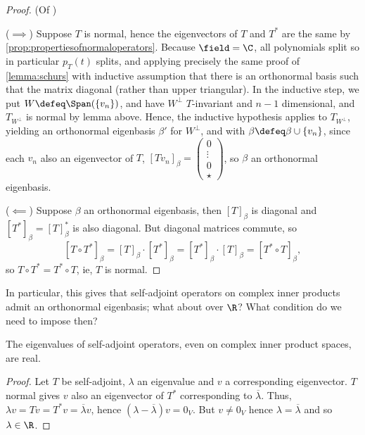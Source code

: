 \begin{proof}(Of )

    ($\implies$) Suppose $T$ is normal, hence the eigenvectors of $T$ and $T^\ast$ are the same by \cref{prop:propertiesofnormaloperators}. Because $\field  = \C$, all polynomials split so in particular $p_T(t)$ splits, and applying precisely the same proof of \cref{lemma:schurs} with inductive assumption that there is an orthonormal basis such that the matrix diagonal (rather than upper triangular). In the inductive step, we put $W \defeq \Span (\{v_n\})$, and have $W^\perp$ $T$-invariant and $n - 1$ dimensional, and $T_{W^\perp}$ is normal by lemma above. Hence, the inductive hypothesis applies to $T_{W^\perp}$, yielding an orthonormal eigenbasis $\beta'$ for $W^\perp$, and  with $\beta \defeq \beta \cup \{v_n\}$, since each $v_n$ also an eigenvector of $T$, $[Tv_n]_\beta = \begin{pmatrix}
        0 \\
        \vdots\\
        0\\
        \star
    \end{pmatrix}$, so $\beta$ an orthonormal eigenbasis.

    ($\impliedby$) Suppose $\beta$ an orthonormal eigenbasis, then $[T]_\beta$ is diagonal and $[T^\ast]_\beta = [T]_\beta^\ast$ is also diagonal. But diagonal matrices commute, so \[
    [T \circ T^\ast]_\beta = [T]_\beta \cdot [T^\ast]_\beta = [T^\ast]_\beta \cdot [T]_\beta = [T^\ast \circ T]_\beta,    
    \]
    so $T\circ T^\ast = T^\ast \circ T$, ie, $T$ is normal.
\end{proof}

In particular, this gives that self-adjoint operators on complex inner products admit an orthonormal eigenbasis; what about over $\R$? What condition do we need to impose then?

\begin{lemma}
    The eigenvalues of self-adjoint operators, even on complex inner product spaces, are real.
\end{lemma}

\begin{proof}
    Let $T$ be self-adjoint, $\lambda$ an eigenvalue and $v$ a corresponding eigenvector. $T$ normal gives $v$ also an eigenvector of $T^\ast$ corresponding to $\overline{\lambda}$. Thus, $\lambda v = Tv = T^\ast v = \overline{\lambda}v$, hence $(\lambda - \overline{\lambda})v = 0_V$. But $v \neq 0_V$ hence $\lambda = \overline{\lambda}$ and so $\lambda \in \R$.
\end{proof}

